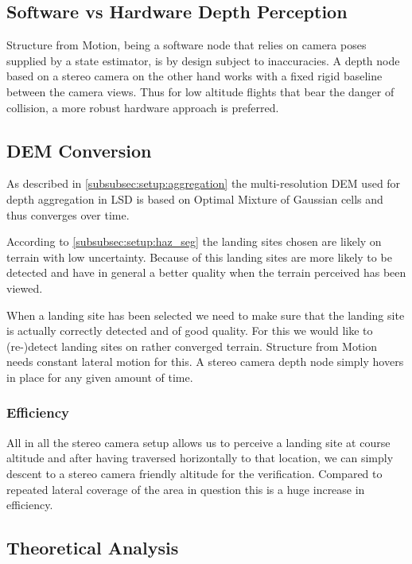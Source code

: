 \subsection{Software vs Hardware Depth Perception}

Structure from Motion, being a software node that relies on camera poses supplied by a state estimator, is by design subject to inaccuracies. A depth node based on a stereo camera on the other hand works with a fixed rigid baseline between the camera views. Thus for low altitude flights that bear the danger of collision, a more robust hardware approach is preferred.

\subsection{DEM Conversion}

As described in \cref{subsubsec:setup:aggregation} the multi-resolution DEM used for depth aggregation in LSD is based on Optimal Mixture of Gaussian cells and thus converges over time. 

According to \cref{subsubsec:setup:haz_seg} the landing sites chosen are likely on terrain with low uncertainty. Because of this landing sites are more likely to be detected and have in general a better quality when the terrain perceived has been viewed.

When a landing site has been selected we need to make sure that the landing site is actually correctly detected and of good quality. For this we would like to (re-)detect landing sites on rather converged terrain. Structure from Motion needs constant lateral motion for this. A stereo camera depth node simply hovers in place for any given amount of time.

\subsubsection{Efficiency}

All in all the stereo camera setup allows us to perceive a landing site at course altitude and after having traversed horizontally to that location, we can simply descent to a stereo camera friendly altitude for the verification. Compared to repeated lateral coverage of the area in question this is a huge increase in efficiency.

\subsection{Theoretical Analysis}


